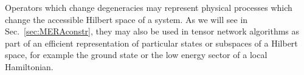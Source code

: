 \documentclass[aps,prb,reprint,superscriptaddress,amsfonts,amsmath,amssymb,showpacs,floatfix]{revtex4-1}
\newcommand{\fref}[1]{Fig.~\ref{#1}}
\newcommand{\sref}[1]{Sec.~\ref{#1}}
\begin{document}

Operators which change degeneracies may %
represent physical processes which change the accessible Hilbert space of a system. %
As we will see in \sref{sec:MERAconstr}, 
they may also be used in tensor network algorithms as part of an efficient representation of particular states or subspaces of a Hilbert space, for example the ground state or the low energy sector of a local Hamiltonian.
\end{document}
